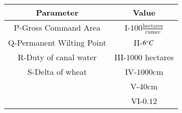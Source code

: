 \begin{tabular}[10pt]{ |c| c|}
    \hline
    \textbf{Parameter}& \textbf{Value}\\ 
    \hline
    P-Gross Command Area &I-$100\frac{\text{hectares}}{\text{cumec}}$\\
    \hline 
    Q-Permanent Wilting Point&II-$6\degree C$\\
    \hline 
    R-Duty of canal water&III-$1000$ hectares\\
    \hline
    S-Delta of wheat&IV-$1000$cm\\
    \hline
    &V-$40$cm\\
    \hline
    &VI-$0.12$\\
    \hline
    \end{tabular}
